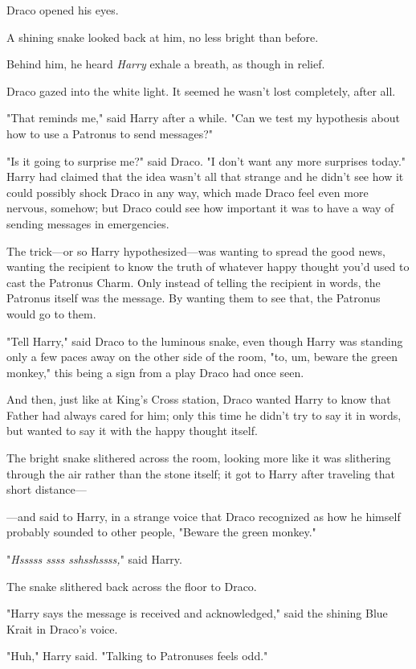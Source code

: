 Draco opened his eyes.

A shining snake looked back at him, no less bright than before.

Behind him, he heard \emph{Harry} exhale a breath, as though in relief.

Draco gazed into the white light. It seemed he wasn't lost completely, after 
all.

"That reminds me," said Harry after a while. "Can we test my hypothesis about 
how to use a Patronus to send messages?"

"Is it going to surprise me?" said Draco. "I don't want any more surprises 
today."
\sbreak
Harry had claimed that the idea wasn't all that strange and he didn't see how 
it could possibly shock Draco in any way, which made Draco feel even more 
nervous, somehow; but Draco could see how important it was to have a way of 
sending messages in emergencies.

The trick---or so Harry hypothesized---was wanting to spread the good news, 
wanting the recipient to know the truth of whatever happy thought you'd used to 
cast the Patronus Charm. Only instead of telling the recipient in words, the 
Patronus itself was the message. By wanting them to see that, the Patronus 
would go to them.

"Tell Harry," said Draco to the luminous snake, even though Harry was standing 
only a few paces away on the other side of the room, "to, um, beware the green 
monkey," this being a sign from a play Draco had once seen.

And then, just like at King's Cross station, Draco wanted Harry to know that 
Father had always cared for him; only this time he didn't try to say it in 
words, but wanted to say it with the happy thought itself.

The bright snake slithered across the room, looking more like it was slithering 
through the air rather than the stone itself; it got to Harry after traveling 
that short distance---

---and said to Harry, in a strange voice that Draco recognized as how he 
himself probably sounded to other people, "Beware the green monkey."

"\emph{Hsssss ssss sshsshssss,}" said Harry.

The snake slithered back across the floor to Draco.

"Harry says the message is received and acknowledged," said the shining Blue 
Krait in Draco's voice.

"Huh," Harry said. "Talking to Patronuses feels odd."

